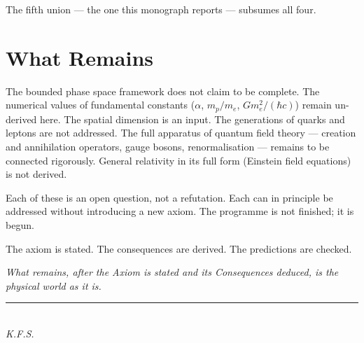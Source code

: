 The fifth union --- the one this monograph reports --- subsumes all four.

\section{What Remains}
\label{sec:ch26-remains}

The bounded phase space framework does not claim to be complete.
The numerical values of fundamental constants ($\alpha$, $m_p/m_e$,
$G m_e^2/(\hbar c)$) remain un-derived here.
The spatial dimension is an input.
The generations of quarks and leptons are not addressed.
The full apparatus of quantum field theory --- creation and annihilation operators,
gauge bosons, renormalisation --- remains to be connected rigorously.
General relativity in its full form (Einstein field equations) is not derived.

Each of these is an open question, not a refutation.
Each can in principle be addressed without introducing a new axiom.
The programme is not finished; it is begun.

\medskip
The axiom is stated.
The consequences are derived.
The predictions are checked.

\emph{What remains, after the Axiom is stated and its Consequences deduced, is
the physical world as it is.}

\vfill
\begin{flushright}
\rule{4cm}{0.4pt}\\
\textit{K.F.S.}
\end{flushright}
